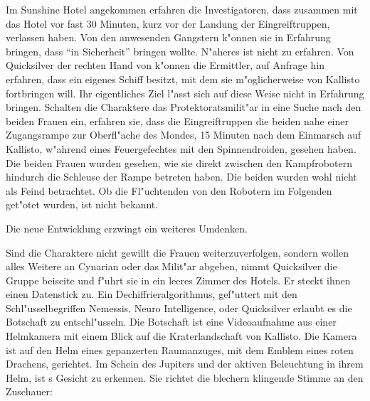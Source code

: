 Im Sunshine Hotel angekommen erfahren die Investigatoren, dass \xl{} zusammen mit \ml{} das Hotel vor fast 30 Minuten, kurz vor der Landung der Eingreiftruppen, verlassen haben. Von den anwesenden Gangstern k"onnen sie in Erfahrung bringen, dass \xl{} \ml{} "`in Sicherheit"' bringen wollte. N"aheres ist nicht zu erfahren. Von Quicksilver der rechten Hand von \xl{} k"onnen die Ermittler, auf Anfrage hin erfahren, dass \xl{} ein eigenes Schiff besitzt, mit dem sie m"oglicherweise \ml{} von Kallisto fortbringen will. Ihr eigentliches Ziel l"asst sich auf diese Weise nicht in Erfahrung bringen. Schalten die Charaktere das Protektoratsmilit"ar in eine Suche nach den beiden Frauen ein, erfahren sie, dass die Eingreiftruppen die beiden nahe einer Zugangsrampe zur Oberfl"ache des Mondes, 15 Minuten nach dem Einmarsch auf Kallisto, w"ahrend eines Feuergefechtes mit den Spinnendroiden, gesehen haben. Die beiden Frauen wurden gesehen, wie sie direkt zwischen den Kampfrobotern hindurch die Schleuse der Rampe betreten haben. Die beiden wurden wohl nicht als Feind betrachtet. Ob die Fl"uchtenden von den Robotern im Folgenden get"otet wurden, ist nicht bekannt.

Die neue Entwicklung erzwingt ein weiteres Umdenken.

Sind die Charaktere nicht gewillt die Frauen weiterzuverfolgen, sondern wollen alles Weitere an Cynarian oder das Milit"ar abgeben, nimmt Quicksilver die Gruppe beiseite und f"uhrt sie in ein leeres Zimmer des Hotels. Er steckt ihnen einen Datenstick zu.  Ein Dechiffrieralgorithmus, gef"uttert mit den Schl"usselbegriffen Nemessis, Neuro Intelligence, \xl{} oder Quicksilver erlaubt es die Botschaft zu entschl"usseln. Die Botschaft ist eine Videoaufnahme aus einer Helmkamera mit einem Blick auf die Kraterlandschaft von Kallisto. Die Kamera ist auf den Helm eines gepanzerten Raumanzuges, mit dem Emblem eines roten Drachens, gerichtet. Im Schein des Jupiters und der aktiven Beleuchtung in ihrem Helm, ist \xl{}s Gesicht zu erkennen. Sie richtet die blechern klingende Stimme an den Zuschauer:


